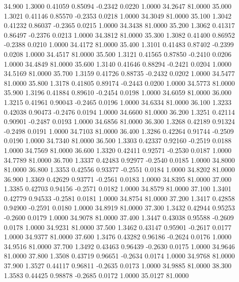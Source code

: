   34.900   1.3000   0.41059   0.85094  -0.2342   0.0220   1.0000  34.2647  81.0000
  35.000   1.3021   0.41146   0.85570  -0.2353   0.0218   1.0000  34.3049  81.0000
  35.100   1.3042   0.41232   0.86037  -0.2365   0.0215   1.0000  34.3438  81.0000
  35.200   1.3062   0.41317   0.86497  -0.2376   0.0213   1.0000  34.3812  81.0000
  35.300   1.3082   0.41400   0.86952  -0.2388   0.0210   1.0000  34.4172  81.0000
  35.400   1.3101   0.41483   0.87402  -0.2399   0.0208   1.0000  34.4517  81.0000
  35.500   1.3121   0.41565   0.87850  -0.2410   0.0206   1.0000  34.4849  81.0000
  35.600   1.3140   0.41646   0.88294  -0.2421   0.0204   1.0000  34.5169  81.0000
  35.700   1.3159   0.41726   0.88735  -0.2432   0.0202   1.0000  34.5477  81.0000
  35.800   1.3178   0.41805   0.89174  -0.2443   0.0200   1.0000  34.5773  81.0000
  35.900   1.3196   0.41884   0.89610  -0.2454   0.0198   1.0000  34.6059  81.0000
  36.000   1.3215   0.41961   0.90043  -0.2465   0.0196   1.0000  34.6334  81.0000
  36.100   1.3233   0.42038   0.90473  -0.2476   0.0194   1.0000  34.6600  81.0000
  36.200   1.3251   0.42114   0.90901  -0.2487   0.0193   1.0000  34.6856  81.0000
  36.300   1.3268   0.42189   0.91324  -0.2498   0.0191   1.0000  34.7103  81.0000
  36.400   1.3286   0.42264   0.91744  -0.2509   0.0190   1.0000  34.7340  81.0000
  36.500   1.3303   0.42337   0.92160  -0.2519   0.0188   1.0000  34.7569  81.0000
  36.600   1.3320   0.42411   0.92571  -0.2530   0.0187   1.0000  34.7789  81.0000
  36.700   1.3337   0.42483   0.92977  -0.2540   0.0185   1.0000  34.8000  81.0000
  36.800   1.3353   0.42556   0.93377  -0.2551   0.0184   1.0000  34.8202  81.0000
  36.900   1.3369   0.42629   0.93771  -0.2561   0.0183   1.0000  34.8395  81.0000
  37.000   1.3385   0.42703   0.94156  -0.2571   0.0182   1.0000  34.8579  81.0000
  37.100   1.3401   0.42779   0.94533  -0.2581   0.0181   1.0000  34.8754  81.0000
  37.200   1.3417   0.42858   0.94900  -0.2591   0.0180   1.0000  34.8919  81.0000
  37.300   1.3432   0.42944   0.95253  -0.2600   0.0179   1.0000  34.9078  81.0000
  37.400   1.3447   0.43038   0.95588  -0.2609   0.0178   1.0000  34.9231  81.0000
  37.500   1.3462   0.43147   0.95901  -0.2617   0.0177   1.0000  34.9377  81.0000
  37.600   1.3476   0.43282   0.96186  -0.2624   0.0176   1.0000  34.9516  81.0000
  37.700   1.3492   0.43463   0.96439  -0.2630   0.0175   1.0000  34.9646  81.0000
  37.800   1.3508   0.43719   0.96651  -0.2634   0.0174   1.0000  34.9768  81.0000
  37.900   1.3527   0.44117   0.96811  -0.2635   0.0173   1.0000  34.9885  81.0000
  38.300   1.3583   0.44425   0.98878  -0.2685   0.0172   1.0000  35.0127  81.0000
